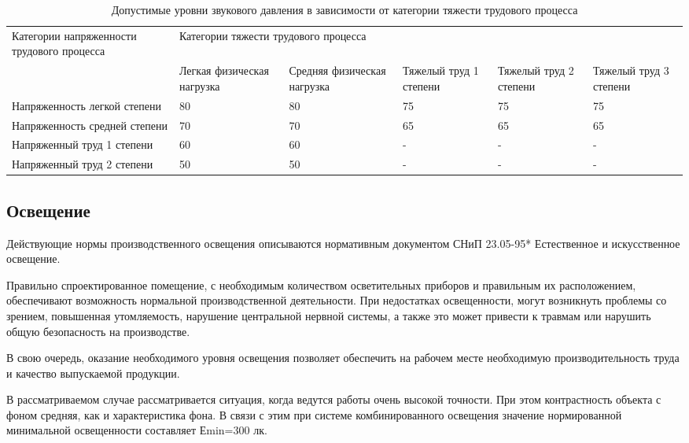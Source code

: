 \begin{table}[!h]
	\begin{center}
		\caption{Допустимые уровни звукового давления в зависимости от категории тяжести трудового процесса}
		\begin{tabular}{|p{35mm}|
			p{20mm}|
			p{20mm}|
			p{20mm}|
			p{20mm}|
			p{20mm}|
		}
	\hline
Категории напряженности трудового процесса & \multicolumn{5}{|p{100mm}|}{ Категории тяжести трудового процесса } \\
	\cline {2-6}
	& Легкая физическая нагрузка	 & Средняя физическая нагрузка	 & Тяжелый труд 1 степени & Тяжелый труд 2 степени	& Тяжелый труд 3 степени \\ \hline
Напряженность легкой степени  &  80  &  80  &  75  &  75  &  75 \\ \hline
Напряженность средней степени  &  70  &  70  &  65  &  65  &  65 \\ \hline
Напряженный труд 1 степени  &   60  &  60  &  -  &  -  &  - \\ \hline
Напряженный труд 2 степени  &   50  &  50  &  -  &  -  &  - \\
	\hline
		\end{tabular}
		\label{tab:eco_sound_pressure}
	\end{center}
\end{table}

\subsection{Освещение}
Действующие нормы производственного освещения описываются нормативным документом СНиП 23.05-95* Естественное и искусственное освещение.

Правильно спроектированное помещение, с необходимым количеством осветительных приборов и правильным их расположением, обеспечивают возможность нормальной производственной деятельности. При недостатках освещенности, могут возникнуть проблемы со зрением, повышенная утомляемость, нарушение центральной нервной системы, а также это может привести к травмам или нарушить общую безопасность на производстве.

В свою очередь, оказание необходимого уровня освещения позволяет обеспечить на рабочем месте необходимую производительность труда и качество выпускаемой продукции.

В рассматриваемом случае рассматривается ситуация, когда ведутся работы очень высокой точности. При этом контрастность объекта с фоном средняя, как и характеристика фона. В связи с этим при системе комбинированного освещения значение нормированной минимальной освещенности составляет Еmin=300 лк.

